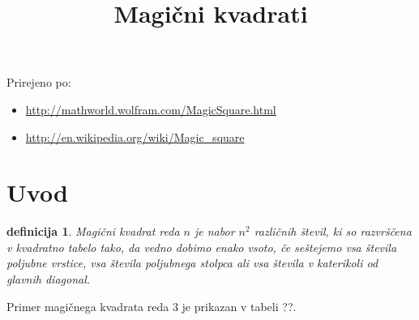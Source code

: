\documentclass[a4paper,12pt]{article}
\title{Magični kvadrati}
\date{}
\newtheorem{Definicija}{definicija}}
\begin{document}
\maketitle

Prirejeno po:

\begin{itemize}
   \item \url{http://mathworld.wolfram.com/MagicSquare.html}
   \item \url{http://en.wikipedia.org/wiki/Magic_square}
\end{itemize}

\tableofcontents


\newpage

\section{Uvod}

\begin{Definicija}
   \emph{Magični kvadrat} reda \(n\) je nabor \(n^2\) različnih števil,
   ki so razvrščena v kvadratno tabelo tako, da vedno dobimo enako vsoto,
   če seštejemo vsa števila poljubne vrstice, vsa števila poljubnega
   stolpca ali vsa števila v katerikoli od glavnih diagonal.
\end{Definicija}

Primer magičnega kvadrata reda 3 je prikazan v tabeli ??. %

\end{document}
